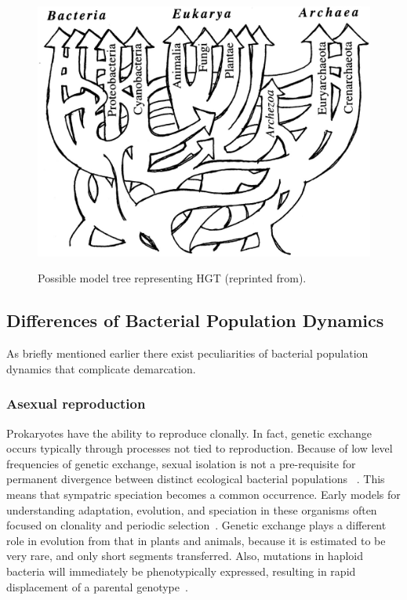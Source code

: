 \begin{figure}
\centering
\includegraphics[scale=0.25]{images/HGTTree-CH1}
\label{fig:HGTmodel}
\caption[Possible model tree representing HGT]{Possible model tree representing HGT (reprinted from\protect\cite{doolittle1999phylogenetic}).}
\label{fig:HGTmodel}
\end{figure}

\subsection{Differences of Bacterial Population Dynamics}
As briefly mentioned earlier there exist peculiarities of bacterial population dynamics that complicate demarcation.

\subsubsection*{Asexual reproduction}
Prokaryotes have the ability to reproduce clonally.
In fact, genetic exchange occurs typically through processes not tied to reproduction.
Because of low level frequencies of genetic exchange, sexual isolation is not a pre-requisite for permanent divergence between distinct ecological bacterial populations ~\cite{cohan2007systematics}.
This means that sympatric speciation becomes a common occurrence.
Early models for understanding adaptation, evolution, and speciation in these organisms often focused on clonality and periodic selection~\cite{gogarten2002prokaryotic}.
Genetic exchange plays a different role in evolution from that in plants and animals, because it is estimated to be very rare, and only short segments transferred.
Also, mutations in haploid bacteria will immediately be phenotypically expressed, resulting in rapid displacement of a parental genotype~\cite{staley1997biodiversity}.

